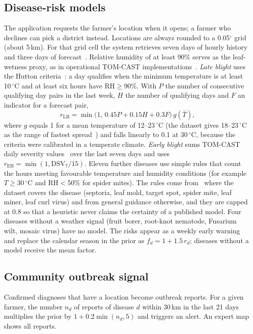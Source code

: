 \documentclass[conference]{IEEEtran}
\begin{document}
\subsection{Disease-risk models}
The application requests the farmer's location when it opens; a farmer who declines can pick a district instead. Locations are always rounded to a 0.05$^\circ$ grid (about 5\,km). For that grid cell the system retrieves seven days of hourly history and three days of forecast~\cite{openmeteo}. Relative humidity of at least 90\% serves as the leaf-wetness proxy, as in operational TOM-CAST implementations~\cite{frost2015}.
\emph{Late blight} uses the Hutton criteria~\cite{ahdb_hutton}: a day qualifies when the minimum temperature is at least 10\,$^\circ$C and at least six hours have RH$\geq$90\%. With $P$ the number of consecutive qualifying day pairs in the last week, $H$ the number of qualifying days and $F$ an indicator for a forecast pair,
\begin{equation}
  r_{\mathrm{LB}} = \min\bigl(1,\,0.45P + 0.15H + 0.3F\bigr)\, g(\bar T),
\end{equation}
where $g$ equals 1 for a mean temperature of 12--23\,$^\circ$C (the dataset gives 18--23\,$^\circ$C as the range of fastest spread~\cite{jagtap2025}) and falls linearly to 0.1 at 30\,$^\circ$C, because the criteria were calibrated in a temperate climate. \emph{Early blight} sums TOM-CAST daily severity values~\cite{madden1978,frost2015} over the last seven days and uses $r_{\mathrm{EB}}=\min(1,\mathrm{DSV}_7/15)$. Eleven further diseases use simple rules that count the hours meeting favourable temperature and humidity conditions (for example $T\geq30$\,$^\circ$C and RH$<$50\% for spider mites). The rules come from~\cite{jagtap2025} where the dataset covers the disease (septoria, leaf mold, target spot, spider mite, leaf miner, leaf curl virus) and from general guidance otherwise, and they are capped at 0.8 so that a heuristic never claims the certainty of a published model. Four diseases without a weather signal (fruit borer, root-knot nematode, Fusarium wilt, mosaic virus) have no model. The risks appear as a weekly early warning and replace the calendar season in the prior as $f_d = 1 + 1.5\,r_d$; diseases without a model receive the mean factor.

\subsection{Community outbreak signal}
Confirmed diagnoses that have a location become outbreak reports. For a given farmer, the number $n_d$ of reports of disease $d$ within 30\,km in the last 21 days multiplies the prior by $1+0.2\min(n_d,5)$ and triggers an alert. An expert map shows all reports.
\end{document}
